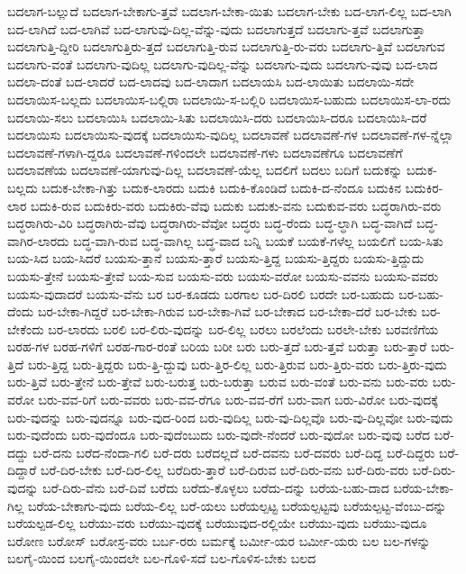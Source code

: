 {ಬದಲಾಗ-ಬಲ್ಲುದೆ
ಬದಲಾಗ-ಬೇಕಾಗು-ತ್ತವೆ
ಬದಲಾಗ-ಬೇಕಾ-ಯಿತು
ಬದಲಾಗ-ಬೇಕು
ಬದ-ಲಾಗ-ಲಿಲ್ಲ
ಬದ-ಲಾಗಿ
ಬದ-ಲಾಗಿದೆ
ಬದ-ಲಾಗಿವೆ
ಬದ-ಲಾಗುವು-ದಿಲ್ಲ-ವೆನ್ನು-ವುದು
ಬದಲಾಗುತ್ತದೆ
ಬದಲಾಗು-ತ್ತವೆ
ಬದಲಾಗುತ್ತಾ
ಬದಲಾಗುತ್ತಿ-ದ್ದೀರಿ
ಬದಲಾಗುತ್ತಿರು-ತ್ತದೆ
ಬದಲಾಗುತ್ತಿ-ರುವ
ಬದಲಾಗುತ್ತಿ-ರು-ವರು
ಬದಲಾಗು-ತ್ತಿವೆ
ಬದಲಾಗುವ
ಬದಲಾಗು-ವಂತೆ
ಬದಲಾಗು-ವುದಿಲ್ಲ
ಬದಲಾಗು-ವುದಿಲ್ಲ-ವೆನ್ನು
ಬದಲಾಗು-ವುದು
ಬದಲಾಗು-ವುವು
ಬದ-ಲಾದ
ಬದಲಾ-ದಂತೆ
ಬದ-ಲಾದರೆ
ಬದ-ಲಾದವು
ಬದ-ಲಾದಾಗ
ಬದಲಾಯಸಿ
ಬದ-ಲಾಯಿತು
ಬದಲಾಯಿ-ಸದೇ
ಬದಲಾಯಿಸ-ಬಲ್ಲದು
ಬದಲಾಯಿಸ-ಬಲ್ಲಿರಾ
ಬದಲಾಯಿ-ಸ-ಬಲ್ಲಿರಿ
ಬದಲಾಯಿಸ-ಬಹುದು
ಬದಲಾಯಿಸ-ಲಾ-ರದು
ಬದಲಾಯಿ-ಸಲು
ಬದಲಾಯಿಸಿ
ಬದಲಾಯಿ-ಸಿತು
ಬದಲಾಯಿಸಿ-ದರು
ಬದಲಾಯಿಸಿ-ದರೂ
ಬದಲಾಯಿಸಿ-ದರೆ
ಬದಲಾಯಿಸು
ಬದಲಾಯಿಸು-ವುದಕ್ಕೆ
ಬದಲಾಯಿಸು-ವುದಿಲ್ಲ
ಬದಲಾವಣೆ
ಬದಲಾವಣೆ-ಗಳ
ಬದಲಾವಣೆ-ಗಳ-ನ್ನೆಲ್ಲಾ
ಬದಲಾವಣೆ-ಗಳಾಗಿ-ದ್ದರೂ
ಬದಲಾವಣೆ-ಗಳಿಂದಲೇ
ಬದಲಾವಣೆ-ಗಳು
ಬದಲಾವಣೆಗೂ
ಬದಲಾವಣೆಗೆ
ಬದಲಾವಣೆಯ
ಬದಲಾವಣೆ-ಯಾಗುವು-ದಿಲ್ಲ
ಬದಲಾವಣೆ-ಯೆಲ್ಲ
ಬದಲಿಗೆ
ಬದಲು
ಬದಿಗೆ
ಬದುಕನ್ನು
ಬದುಕ-ಬಲ್ಲದು
ಬದುಕ-ಬೇಕಾ-ಗಿತ್ತು
ಬದುಕ-ಲಾರದು
ಬದುಕಿ
ಬದುಕಿ-ಕೊಂಡಿದೆ
ಬದುಕಿ-ದ-ನೆಂದೂ
ಬದುಕಿನ
ಬದುಕಿರ-ಲಾರ
ಬದುಕಿ-ರುವ
ಬದುಕಿರು-ವರು
ಬದುಕಿರು-ವೆವು
ಬದುಕು
ಬದುಕು-ವನು
ಬದುಕುವ-ವರು
ಬದ್ಧರಾಗಿರು-ವರು
ಬದ್ಧರಾಗಿರು-ವಿರಿ
ಬದ್ಧರಾಗಿರು-ವೆವು
ಬದ್ಧರಾಗಿರು-ವೆವೋ
ಬದ್ಧರು
ಬದ್ಧ-ರೆಂದು
ಬದ್ಧ-ಲ್ಧಾಗಿ
ಬದ್ಧ-ವಾಗಿದೆ
ಬದ್ಧ-ವಾಗಿರ-ಲಾರದು
ಬದ್ಧ-ವಾಗಿ-ರುವ
ಬದ್ಧ-ವಾಗಿಲ್ಲ
ಬದ್ಧ-ವಾದ
ಬನ್ನಿ
ಬಯಕೆ
ಬಯಕೆ-ಗಳೆಲ್ಲ
ಬಯಲಿಗೆ
ಬಯ-ಸಿತು
ಬಯ-ಸಿದ
ಬಯ-ಸಿದರೆ
ಬಯಸು-ತ್ತಾನೆ
ಬಯಸು-ತ್ತಾರೆ
ಬಯಸು-ತ್ತಿದ್ದ
ಬಯಸು-ತ್ತಿದ್ದರು
ಬಯಸು-ತ್ತಿದ್ದುದು
ಬಯಸು-ತ್ತೇನೆ
ಬಯಸು-ತ್ತೇವೆ
ಬಯ-ಸುವ
ಬಯಸು-ವರು
ಬಯಸು-ವರೋ
ಬಯಸು-ವವನು
ಬಯಸು-ವವರು
ಬಯಸು-ವುದಾದರೆ
ಬಯಸು-ವೆನು
ಬರ
ಬರ-ಕೂಡದು
ಬರಗಾಲ
ಬರ-ದಿರಲಿ
ಬರದೇ
ಬರ-ಬಹುದು
ಬರ-ಬಹು-ದೆಂದು
ಬರ-ಬೇಕಾ-ಗಿದ್ದರೆ
ಬರ-ಬೇಕಾ-ಗಿರುವ
ಬರ-ಬೇಕಾ-ಗಿವೆ
ಬರ-ಬೇಕಾದ
ಬರ-ಬೇಕಾ-ದರೆ
ಬರ-ಬೇಕು
ಬರ-ಬೇಕೆಂದು
ಬರ-ಲಾರದು
ಬರಲಿ
ಬರ-ಲಿರು-ವುದನ್ನು
ಬರ-ಲಿಲ್ಲ
ಬರಲು
ಬರಲೆಂದು
ಬರಲೇ-ಬೇಕು
ಬರವಣಿಗೆಯ
ಬರಹ-ಗಳ
ಬರಹ-ಗಳಿಗೆ
ಬರಹ-ಗಾರ-ರಂತೆ
ಬರಿಯ
ಬರೀ
ಬರು
ಬರು-ತ್ತದೆ
ಬರು-ತ್ತವೆ
ಬರುತ್ತಾ
ಬರು-ತ್ತಾರೆ
ಬರು-ತ್ತಿದೆ
ಬರು-ತ್ತಿದ್ದ
ಬರು-ತ್ತಿದ್ದರು
ಬರು-ತ್ತಿ-ದ್ದುವು
ಬರು-ತ್ತಿರ-ಲಿಲ್ಲ
ಬರು-ತ್ತಿರುವ
ಬರು-ತ್ತಿರು-ವರು
ಬರು-ತ್ತಿರು-ವುದು
ಬರು-ತ್ತಿವೆ
ಬರು-ತ್ತೇನೆ
ಬರು-ತ್ತೇವೆ
ಬರು-ಬರುತ್ತ
ಬರು-ಬರುತ್ತಾ
ಬರುವ
ಬರು-ವಂತೆ
ಬರು-ವನು
ಬರು-ವರು
ಬರು-ವರೋ
ಬರು-ವವ-ರಿಗೆ
ಬರು-ವವರು
ಬರು-ವವ-ರೆಗೂ
ಬರು-ವವ-ರೆಗೆ
ಬರು-ವಾಗ
ಬರು-ವಿರೋ
ಬರು-ವುದಕ್ಕೆ
ಬರು-ವುದನ್ನು
ಬರು-ವುದನ್ನೂ
ಬರು-ವುದ-ರಿಂದ
ಬರು-ವುದಿಲ್ಲ
ಬರು-ವು-ದಿಲ್ಲವೊ
ಬರು-ವು-ದಿಲ್ಲವೋ
ಬರು-ವುದು
ಬರು-ವುದೆಂದು
ಬರು-ವುದೆಂದೂ
ಬರು-ವುದೆಂಬುದು
ಬರು-ವುದೇ-ನೆಂದರೆ
ಬರು-ವುದೋ
ಬರು-ವುವು
ಬರೆದ
ಬರೆ-ದದ್ದು
ಬರೆ-ದನು
ಬರೆದ-ನೆಂದಾ-ಗಲಿ
ಬರೆ-ದರು
ಬರೆದಲ್ಲದೆ
ಬರೆ-ದವನು
ಬರೆ-ದವರು
ಬರೆ-ದಿದ್ದ
ಬರೆ-ದಿದ್ದರು
ಬರೆ-ದಿದ್ದಾರೆ
ಬರೆ-ದಿರ-ಬೇಕು
ಬರೆ-ದಿರ-ಲಿಲ್ಲ
ಬರೆದಿರು-ತ್ತಾರೆ
ಬರೆ-ದಿರುವ
ಬರೆ-ದಿರು-ವನು
ಬರೆ-ದಿರು-ವರು
ಬರೆ-ದಿರು-ವುದನ್ನು
ಬರೆ-ದಿರು-ವೆನು
ಬರೆ-ದಿವೆ
ಬರೆದು
ಬರೆದು-ಕೊಳ್ಳಲು
ಬರೆದು-ದನ್ನು
ಬರೆಯ-ಬಹು-ದಾದ
ಬರೆಯ-ಬೇಕಾ-ಗಿಲ್ಲ
ಬರೆಯ-ಬೇಕಾಗು-ವುದು
ಬರೆಯ-ಲಿಲ್ಲ
ಬರೆ-ಯಲು
ಬರೆಯಲ್ಪಟ್ಟ
ಬರೆಯಲ್ಪಟ್ಟವು
ಬರೆಯಲ್ಪಟ್ಟ-ವೆಂಬು-ದನ್ನು
ಬರೆಯಲ್ಪಡ-ಲಿಲ್ಲ
ಬರೆಯು-ವರು
ಬರೆಯು-ವುದಕ್ಕೆ
ಬರೆಯುವುದ-ರಲ್ಲಿಯೇ
ಬರೆಯು-ವುದು
ಬರೆಯು-ವುದೂ
ಬರೋಣ
ಬರೋಸ್
ಬರೋಸ್ರ-ವರು
ಬರ್ಬ-ರರು
ಬರ್ಮಕ್ಕೆ
ಬರ್ಮೀ-ಯರ
ಬರ್ಮೀ-ಯರು
ಬಲ
ಬಲ-ಗಳನ್ನು
ಬಲಗೈ-ಯಿಂದ
ಬಲಗೈ-ಯಿಂದಲೇ
ಬಲ-ಗೊಳಿ-ಸದೆ
ಬಲ-ಗೊಳಿಸ-ಬೇಕು
ಬಲದ
}
